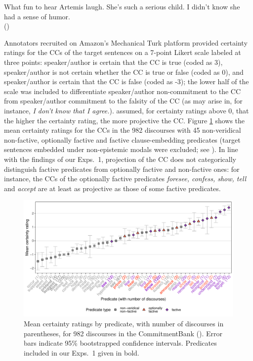 \documentclass[11pt,fleqn]{article}
\newcommand{\6}{\mbox{$[\hspace*{-.6mm}[$}}
\newcommand{\9}{\mbox{$]\hspace*{-.6mm}]$}}
\begin{document}
\begin{exe}
\ex\label{cb} What fun to hear Artemis laugh. She's such a serious child. I didn't know she had a sense of humor. \\ \hspace*{.2cm} \hfill (\citealt[109]{demarneffe-etal-sub23})
\end{exe}
Annotators recruited on Amazon's Mechanical Turk platform provided certainty ratings for the CCs of the target sentences on a 7-point Likert scale labeled at three points: speaker/author is certain that the CC is true (coded as 3), speaker/author is not certain whether the CC is true or false (coded as 0), and speaker/author is certain that the CC is false (coded as -3); the lower half of the scale was included to differentiate speaker/author non-commitment to the CC from speaker/author commitment to the falsity of the CC (as may arise in, for instance, {\em I don't know that I agree.}). \citet{demarneffe-etal-sub23} assumed, for certainty ratings above 0, that the higher the certainty rating, the more projective the CC. Figure \ref{f-commitmentbank} shows the mean certainty ratings for the CCs in the 982 discourses with 45 non-veridical non-factive, optionally factive and factive clause-embedding predicates (target sentences embedded under non-epistemic modals were excluded; see \citealt[\S3]{demarneffe-etal-sub23}). In line with the findings of our Exps.~1, projection of the CC does not categorically distinguish factive predicates from optionally factive and non-factive ones: for instance, the CCs of the optionally factive predicates {\em foresee, confess, show, tell} and {\em accept} are at least as projective as those of some factive predicates. 

\begin{figure}[H]
\centering
\includegraphics[width=.75\paperwidth]{../../CommitmentBank-analysis/graphs/means-projectivity-by-predicate-variability}

\caption{Mean certainty ratings by predicate, with number of discourses in parentheses, for 982 discourses in the CommitmentBank (\citealt*{demarneffe-etal-sub23}). Error bars indicate 95\% bootstrapped confidence intervals. Predicates included in our Exps.~1 given in bold.}
\label{f-commitmentbank}
\end{figure}
\end{document}
